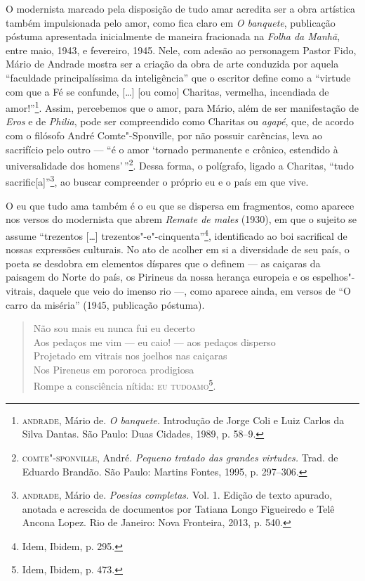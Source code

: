O modernista marcado pela disposição de tudo amar acredita ser a obra
artística também impulsionada pelo amor, como fica claro em \emph{O
banquete}, publicação póstuma apresentada inicialmente de maneira
fracionada na \emph{Folha da Manhã}, entre maio, 1943, e fevereiro,
1945. Nele, com adesão ao personagem Pastor Fido, Mário de Andrade
mostra ser a criação da obra de arte conduzida por aquela ``faculdade
principalíssima da inteligência'' que o escritor define como a ``virtude
com que a Fé se confunde, {[}\ldots{}{]} {[}ou como{]} Charitas, vermelha,
incendiada de amor!''\footnote{\textsc{andrade}, Mário de. \emph{O banquete.}
  Introdução de Jorge Coli e Luiz Carlos da Silva Dantas. São Paulo:
  Duas Cidades, 1989, p. 58--9.}. Assim, percebemos que o amor, para
Mário, além de ser manifestação de \emph{Eros} e de \emph{Philia}, pode
ser compreendido como Charitas ou \emph{agapé}, que, de acordo com o
filósofo André Comte"-Sponville, por não possuir carências, leva ao
sacrifício pelo outro --- ``é o amor `tornado permanente e crônico,
estendido à universalidade dos homens'\,''\footnote{\textsc{comte"-sponville},
  André. \emph{Pequeno tratado das grandes virtudes.} Trad. de Eduardo
  Brandão. São Paulo: Martins Fontes, 1995, p. 297--306.}. Dessa forma, o
polígrafo, ligado a Charitas, ``tudo sacrific{[}a{]}''\footnote{\textsc{andrade},
  Mário de. \emph{Poesias completas.} Vol. 1. Edição de texto apurado,
  anotada e acrescida de documentos por Tatiana Longo Figueiredo e Telê
  Ancona Lopez. Rio de Janeiro: Nova Fronteira, 2013, p. 540.}, ao
buscar compreender o próprio eu e o país em que vive.

O eu que tudo ama também é o eu que se dispersa em fragmentos, como
aparece nos versos do modernista que abrem \emph{Remate de males}
(1930), em que o sujeito se assume ``trezentos {[}\ldots{}{]}
trezentos"-e"-cinquenta''\footnote{Idem, Ibidem, p. 295.}, identificado ao
boi sacrifical de nossas expressões culturais. No ato de acolher em si a
diversidade de seu país, o poeta se desdobra em elementos díspares que o
definem --- as caiçaras da paisagem do Norte do país, os Pirineus da
nossa herança europeia e os espelhos"-vitrais, daquele que veio do imenso
rio ---, como aparece ainda, em versos de ``O carro da miséria'' (1945,
publicação póstuma).

\medskip

\begin{verse}
Não sou mais eu nunca fui eu decerto\\
Aos pedaços me vim --- eu caio! --- aos pedaços disperso\\
Projetado em vitrais nos joelhos nas caiçaras\\
Nos Pireneus em pororoca prodigiosa\\
Rompe a consciência nítida: \textsc{eu tudoamo}\footnote{Idem, Ibidem, p. 473.}.
\end{verse}

